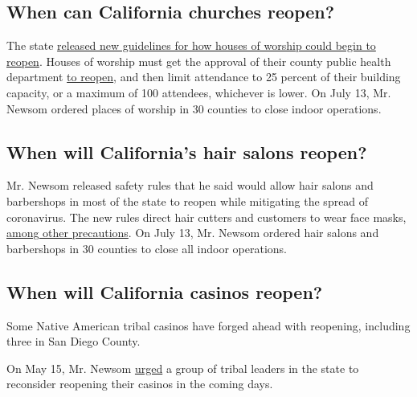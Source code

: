 \hypertarget{when-can-california-churches-reopen}{%
\subsection{When can California churches
reopen?}\label{when-can-california-churches-reopen}}

The state
\href{https://covid19.ca.gov/pdf/guidance-places-of-worship.pdf}{released
new guidelines for how houses of worship could begin to reopen}. Houses
of worship must get the approval of their county public health
department
\href{https://www.nytimes.com/2020/05/25/world/coronavirus-news-cases-deaths.html\#link-8d1a66e}{to
reopen}, and then limit attendance to 25 percent of their building
capacity, or a maximum of 100 attendees, whichever is lower. On July 13,
Mr. Newsom ordered places of worship in 30 counties to close indoor
operations.

\hypertarget{when-will-californias-hair-salons-reopen}{%
\subsection{When will California's hair salons
reopen?}\label{when-will-californias-hair-salons-reopen}}

Mr. Newsom released safety rules that he said would allow hair salons
and barbershops in most of the state to reopen while mitigating the
spread of coronavirus. The new rules direct hair cutters and customers
to wear face masks,
\href{https://covid19.ca.gov/pdf/guidance-hair-salons.pdf}{among other
precautions}. On July 13, Mr. Newsom ordered hair salons and barbershops
in 30 counties to close all indoor operations.

\hypertarget{when-will-california-casinos-reopen}{%
\subsection{When will California casinos
reopen?}\label{when-will-california-casinos-reopen}}

Some Native American tribal casinos have forged ahead with reopening,
including three in San Diego County.

On May 15, Mr. Newsom
\href{https://www.latimes.com/california/story/2020-05-15/california-tribal-casinos-urged-by-newsom-to-remain-closed-with-current-coronavirus-fears}{urged}
a group of tribal leaders in the state to reconsider reopening their
casinos in the coming days.

\href{https://www.nytimes.com/news-event/coronavirus?action=click\&pgtype=Article\&state=default\&region=MAIN_CONTENT_3\&context=storylines_faq}{}

